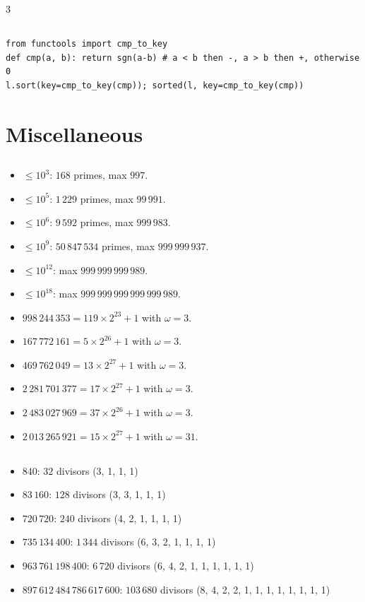\documentclass[landscape, 8pt, a4paper, oneside]{extarticle}
\begin{document}
\begin{multicols*}{3}
\subsection{}
\begin{verbatim}
from functools import cmp_to_key
def cmp(a, b): return sgn(a-b) # a < b then -, a > b then +, otherwise 0
l.sort(key=cmp_to_key(cmp)); sorted(l, key=cmp_to_key(cmp))
\end{verbatim}
\section{Miscellaneous}
\subsection{}
\begin{itemize}
	\item $\le 10^3$: $168$ primes, max $997$.
	\item $\le 10^5$: $1\,229$ primes, max $99\,991$.
	\item $\le 10^6$: $9\,592$ primes, max $999\,983$.
	\item $\le 10^9$: $50\,847\,534$ primes, max $999\,999\,937$.
	\item $\le 10^{12}$: max $999\,999\,999\,989$.
	\item $\le 10^{18}$: max $999\,999\,999\,999\,999\,989$.
	\item $998\,244\,353 = 119 \times 2^{23} + 1$ with $\omega = 3$.
	\item $167\,772\,161 = 5 \times 2^{26} + 1$ with $\omega = 3$.
	\item $469\,762\,049 = 13 \times 2^{27} + 1$ with $\omega = 3$.
	\item $2\,281\,701\,377 = 17 \times 2^{27} + 1$ with $\omega = 3$.
	\item $2\,483\,027\,969 = 37 \times 2^{26} + 1$ with $\omega = 3$.
	\item $2\,013\,265\,921 = 15 \times 2^{27} + 1$ with $\omega = 31$.
\end{itemize}
\subsection{}
\begin{itemize}
	\item $840$: $32$ divisors (3, 1, 1, 1)
	\item $83\,160$: $128$ divisors (3, 3, 1, 1, 1)
	\item $720\,720$: $240$ divisors (4, 2, 1, 1, 1, 1)
	\item $735\,134\,400$: $1\,344$ divisors (6, 3, 2, 1, 1, 1, 1)
	\item $963\,761\,198\,400$: $6\,720$ divisors (6, 4, 2, 1, 1, 1, 1, 1, 1)
	\item $897\,612\,484\,786\,617\,600$: $103\,680$ divisors (8, 4, 2, 2, 1, 1, 1, 1, 1, 1, 1, 1)
\end{itemize}

\end{multicols*}
\end{document}
